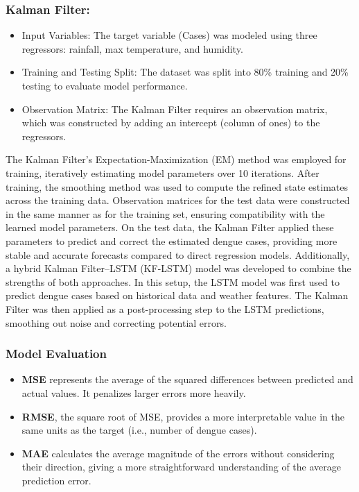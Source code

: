 \subsubsection{Kalman Filter:}
\begin{itemize}
	\item Input Variables: The target variable (Cases) was modeled using three regressors: rainfall, max temperature, and humidity.
	\item Training and Testing Split: The dataset was split into 80\% training and 20\% testing to evaluate model performance.
	\item Observation Matrix: The Kalman Filter requires an observation matrix, which was constructed by adding an intercept (column of ones) to the regressors.
\end{itemize}

The Kalman Filter's Expectation-Maximization (EM) method was employed for training, iteratively estimating model parameters over 10 iterations. After training, the smoothing method was used to compute the refined state estimates across the training data. Observation matrices for the test data were constructed in the same manner as for the training set, ensuring compatibility with the learned model parameters. On the test data, the Kalman Filter applied these parameters to predict and correct the estimated dengue cases, providing more stable and accurate forecasts compared to direct regression models. Additionally, a hybrid Kalman Filter–LSTM (KF-LSTM) model was developed to combine the strengths of both approaches. In this setup, the LSTM model was first used to predict dengue cases based on historical data and weather features. The Kalman Filter was then applied as a post-processing step to the LSTM predictions, smoothing out noise and correcting potential errors.

\subsubsection{\textbf{Model Evaluation}}
\begin{itemize}
	\item \textbf{MSE} represents the average of the squared differences between predicted and actual values. It penalizes larger errors more heavily.
	\item \textbf{RMSE}, the square root of MSE, provides a more interpretable value in the same units as the target (i.e., number of dengue cases).
	\item \textbf{MAE} calculates the average magnitude of the errors without considering their direction, giving a more straightforward understanding of the average prediction error.
\end{itemize}


